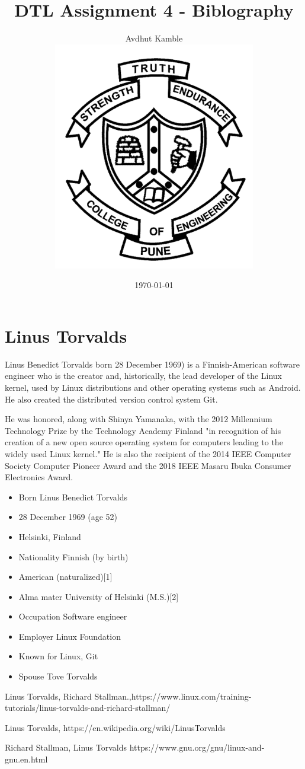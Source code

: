 \documentclass[11pt,a4paper]{report}
\title{DTL Assignment 4 - Biblography}
\author{Avdhut Kamble  \\		\includegraphics[height=10cm]{COEP.png}}
\date{\today}
\begin{document}
	\maketitle
	\section{Linus Torvalds} 
	Linus Benedict Torvalds born 28 December 1969) is a Finnish-American software engineer who is the creator and, historically, the lead developer of the Linux kernel, used by Linux distributions and other operating systems such as Android. He also created the distributed version control system Git.~\cite{Linus}
	
	He was honored, along with Shinya Yamanaka, with the 2012 Millennium Technology Prize by the Technology Academy Finland "in recognition of his creation of a new open source operating system for computers leading to the widely used Linux kernel." He is also the recipient of the 2014 IEEE Computer Society Computer Pioneer Award and the 2018 IEEE Masaru Ibuka Consumer Electronics Award.~\cite{GNU}
	
	\begin{itemize}
		\item Born	Linus Benedict Torvalds
		\item 28 December 1969 (age 52)
		\item Helsinki, Finland
		\item Nationality	Finnish (by birth)
		\item American (naturalized)[1]
		\item Alma mater	University of Helsinki (M.S.)[2]
		\item Occupation	Software engineer
		\item Employer	Linux Foundation
		\item Known for	Linux, Git
		\item Spouse	Tove Torvalds
		~\cite{Wikipedia}
		
	\end{itemize}	
	
	\begin{thebibliography} {}
		
		Linus Torvalds, Richard Stallman.,https://www.linux.com/training-tutorials/linus-torvalds-and-richard-stallman/
		
		Linus Torvalds, https://en.wikipedia.org/wiki/LinusTorvalds
		
		 Richard Stallman, Linus Torvalds https://www.gnu.org/gnu/linux-and-gnu.en.html
		
		
		
		
	\end{thebibliography} 
	
\end{document}
